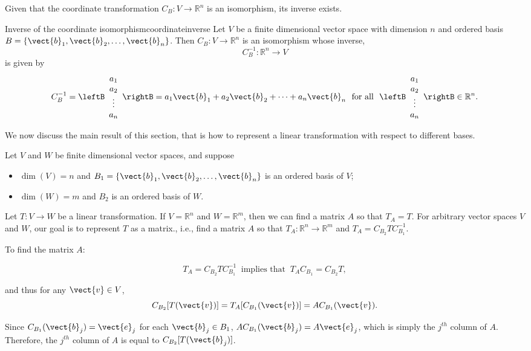 Given that the coordinate transformation $C_B:V\to\mathbb{R}^n$ is an isomorphism, its inverse exists. 

\begin{theorem}{Inverse of the coordinate isomorphism}{coordinateinverse}
Let $V$ be a finite dimensional vector space with dimension $n$
and ordered basis $B=\{\vect{b}_1, \vect{b}_2, \ldots, \vect{b}_n\}$.
Then $C_B:V\to\mathbb{R}^n$ is an isomorphism whose inverse,
\[ C_B^{-1}:\mathbb{R}^n\to V\]
is given by
\[  C_B^{-1} =\leftB\begin{array}{c}
a_1 \\ a_2 \\ \vdots \\ a_n \end{array}\rightB =
a_1\vect{b}_1 + a_2\vect{b}_2 + \cdots + a_n\vect{b}_n
~\mbox{ for all }~
\leftB\begin{array}{c}
a_1 \\ a_2 \\ \vdots \\ a_n \end{array}\rightB \in\mathbb{R}^n.  \]
\end{theorem}

We now discuss the main result of this section, that is how
to represent a linear transformation with respect to different
bases.

Let $V$ and $W$ be finite dimensional vector spaces, and suppose
\begin{itemize}
\item $\dim(V)=n$ and $B_1=\{\vect{b}_1, \vect{b}_2, \ldots, \vect{b}_n\}$
is an ordered basis of $V$;
\item $\dim(W)=m$ and $B_2$ is an ordered basis of $W$.
\end{itemize}
Let $T:V\to W$ be a linear transformation.
If $V=\mathbb{R}^n$ and $W=\mathbb{R}^m$, then we can find a
matrix $A$ so that $T_A=T$. For arbitrary vector spaces $V$ and $W$, 
our goal is to represent $T$ as a matrix.,
i.e., 
find a matrix $A$ so that $T_A:\mathbb{R}^n\to\mathbb{R}^m$
and $T_A=C_{B_2}TC_{B_1}^{-1}$.

To find the matrix $A$:

\[ T_A=C_{B_2}TC_{B_1}^{-1}~\mbox{ implies that }~
T_AC_{B_1}=C_{B_2}T,\]

and thus for any $\vect{v}\in V$, 
\[ C_{B_2}[T(\vect{v})] = T_A[C_{B_1}(\vect{v})] 
=AC_{B_1}(\vect{v}).\]

Since $C_{B_1}(\vect{b}_j)=\vect{e}_j$
for each $\vect{b}_j\in B_1$,
$AC_{B_1}(\vect{b}_j)=A\vect{e}_j$, which is simply the
$j^{th}$ column of $A$.
Therefore, the $j^{th}$ column of $A$ is equal to $C_{B_2}[T(\vect{b}_j)]$.

